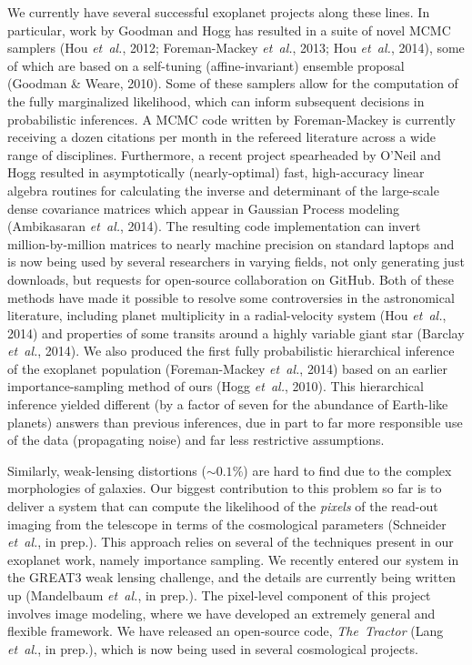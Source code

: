 \documentclass[12pt]{article}
\newcommand{\foreign}[1]{\textsl{#1}}
\newcommand{\etal}{\foreign{et~al.}}
\newcommand{\project}[1]{\textsl{#1}}
\begin{document}
We currently have several successful exoplanet projects along these
lines.
In particular, work by Goodman and Hogg has resulted in a suite of novel
MCMC samplers (Hou \etal, 2012; Foreman-Mackey \etal, 2013; Hou \etal,
2014), some of which are based on a self-tuning (affine-invariant)
ensemble proposal (Goodman \& Weare, 2010).
Some of these samplers allow for the computation of the fully
marginalized likelihood, which can inform subsequent decisions in
probabilistic inferences.
A MCMC code written by Foreman-Mackey is currently receiving a dozen
citations per month in the refereed literature across a wide range of
disciplines.
Furthermore, a recent project spearheaded by O'Neil and Hogg resulted in
asymptotically (nearly-optimal) fast, high-accuracy linear algebra
routines for calculating the inverse and determinant of the large-scale
dense covariance matrices which appear in Gaussian Process modeling
(Ambikasaran \etal, 2014).
The resulting code implementation can invert million-by-million matrices
to nearly machine precision on standard laptops and is now being used by
several researchers in varying fields, not only generating just
downloads, but requests for open-source collaboration on GitHub.
Both of these methods have made it possible to resolve some
controversies in the astronomical literature, including planet
multiplicity in a radial-velocity system (Hou \etal, 2014) and
properties of some transits around a highly variable giant star (Barclay
\etal, 2014).
We also produced the first fully probabilistic hierarchical inference of
the exoplanet population (Foreman-Mackey \etal, 2014) based on an
earlier importance-sampling method of ours (Hogg \etal, 2010).
This hierarchical inference yielded different (by a factor of seven for
the abundance of Earth-like planets) answers than previous inferences,
due in part to far more responsible use of the data (propagating noise)
and far less restrictive assumptions.

Similarly, weak-lensing distortions ($\sim 0.1\%$) are hard to find
due to the complex morphologies of galaxies.
Our biggest contribution to this problem so far is to deliver a system
that can compute the likelihood of the \emph{pixels} of the read-out
imaging from the telescope in terms of the cosmological parameters
(Schneider \etal, in prep.).
This approach relies on several of the techniques present in our exoplanet
work, namely importance sampling.
We recently entered our system in the GREAT3 weak lensing challenge, and
the details are currently being written up (Mandelbaum \etal, in prep.).
The pixel-level component of this project involves image modeling,
where we have developed an extremely general and flexible framework.
We have released an open-source code, \project{The~Tractor} (Lang \etal,
in prep.), which is now being used in several cosmological projects.
\end{document}
